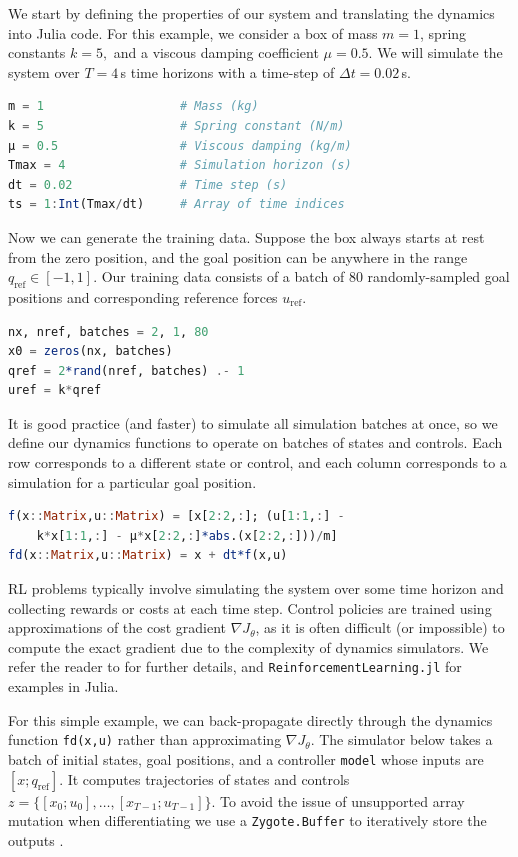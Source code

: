 We start by defining the properties of our system and translating the dynamics into Julia code. For this example, we consider a box of mass $m=1$, spring constants $k=5,$ and a viscous damping coefficient $\mu = 0.5$. We will simulate the system over $T = 4$\,s time horizons with a time-step of $\Delta t = 0.02$\,s.

\begin{lstlisting}[language = Julia]
m = 1                   # Mass (kg)
k = 5                   # Spring constant (N/m)
μ = 0.5                 # Viscous damping (kg/m)
Tmax = 4                # Simulation horizon (s)
dt = 0.02               # Time step (s)
ts = 1:Int(Tmax/dt)     # Array of time indices
\end{lstlisting}

Now we can generate the training data. Suppose the box always starts at rest from the zero position, and the goal position can be anywhere in the range $q_\mathrm{ref} \in [-1,1]$. Our training data consists of a batch of 80 randomly-sampled goal positions and corresponding reference forces $u_\mathrm{ref}$.
\begin{lstlisting}[language = Julia]
nx, nref, batches = 2, 1, 80
x0 = zeros(nx, batches)
qref = 2*rand(nref, batches) .- 1
uref = k*qref
\end{lstlisting}

It is good practice (and faster) to simulate all simulation batches at once, so we define our dynamics functions to operate on batches of states and controls. Each row corresponds to a different state or control, and each column corresponds to a simulation for a particular goal position.

\begin{lstlisting}[language = Julia]
f(x::Matrix,u::Matrix) = [x[2:2,:]; (u[1:1,:] - 
    k*x[1:1,:] - μ*x[2:2,:]*abs.(x[2:2,:]))/m]
fd(x::Matrix,u::Matrix) = x + dt*f(x,u)
\end{lstlisting}

RL problems typically involve simulating the system over some time horizon and collecting rewards or costs at each time step. Control policies are trained using approximations of the cost gradient $\nabla J_\theta$, as it is often difficult (or impossible) to compute the exact gradient due to the complexity of dynamics simulators. We refer the reader to \cite{Sutton+Barto2018} for further details, and \verb|ReinforcementLearning.jl| \cite{Tian++2020} for examples in Julia.

For this simple example, we can back-propagate directly through the dynamics function \verb|fd(x,u)| rather than approximating  $\nabla J_\theta$. The simulator below takes a batch of initial states, goal positions, and a controller \verb|model| whose inputs are $[x; q_\mathrm{ref}]$. It computes trajectories of states and controls $z = \{[x_0;u_0], \ldots, [x_{T-1};u_{T-1}]\}$. To avoid the issue of unsupported array mutation when differentiating we use a \verb|Zygote.Buffer| to iteratively store the outputs \cite{Innes2018b}.

